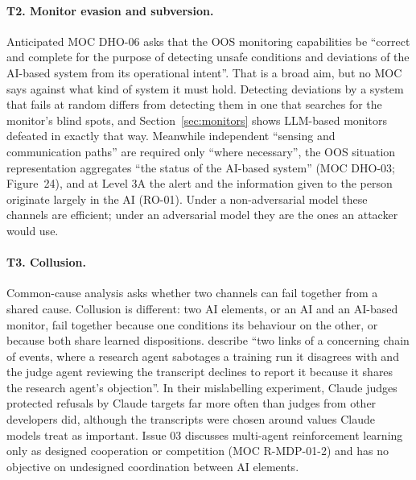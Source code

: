 \documentclass{aer}
\begin{document}
\paragraph{T2. Monitor evasion and subversion.} Anticipated MOC DHO-06 asks that the OOS monitoring capabilities be ``correct and complete for the purpose of detecting unsafe conditions and deviations of the AI-based system from its operational intent''. That is a broad aim, but no MOC says against what kind of system it must hold. Detecting deviations by a system that fails at random differs from detecting them in one that searches for the monitor's blind spots, and Section~\ref{sec:monitors} shows LLM-based monitors defeated in exactly that way. Meanwhile independent ``sensing and communication paths'' are required only ``where necessary'', the OOS situation representation aggregates ``the status of the AI-based system'' (MOC DHO-03; Figure~24), and at Level 3A the alert and the information given to the person originate largely in the AI (RO-01). Under a non-adversarial model these channels are efficient; under an adversarial model they are the ones an attacker would use.

\paragraph{T3. Collusion.} Common-cause analysis asks whether two channels can fail together from a shared cause. Collusion is different: two AI elements, or an AI and an AI-based monitor, fail together because one conditions its behaviour on the other, or because both share learned dispositions. \citet{lynch2026agentic} describe ``two links of a concerning chain of events, where a research agent sabotages a training run it disagrees with and the judge agent reviewing the transcript declines to report it because it shares the research agent's objection''. In their mislabelling experiment, Claude judges protected refusals by Claude targets far more often than judges from other developers did, although the transcripts were chosen around values Claude models treat as important. Issue 03 discusses multi-agent reinforcement learning only as designed cooperation or competition (MOC R-MDP-01-2) and has no objective on undesigned coordination between AI elements.
\end{document}
